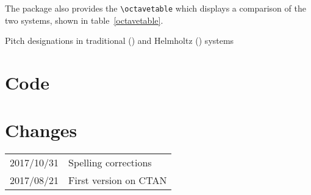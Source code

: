 \documentclass{article}
\begin{document}
The package also provides the \verb|\octavetable| which displays a comparison
of the two systems, shown in table~\ref{octavetable}.

\begin{table}
    \caption{Pitch designations in traditional () and Helmholtz
    () systems}
    \label{octavetable}
    \begin{center}
    \octavetable
    \end{center}
\end{table}

\section{Code}


\section{Changes}

\begin{tabular}{r p{}}
    2017/10/31 & Spelling corrections\\
    2017/08/21 & First version on CTAN\\
\end{tabular}
\end{document}
